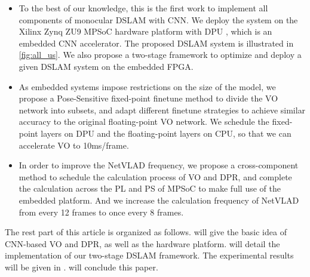 \begin{itemize}
\item To the best of our knowledge, this is the first work to implement all components of monocular DSLAM with CNN. We deploy the system on the Xilinx Zynq ZU9 MPSoC hardware platform with DPU \cite{Tech:2019360}, which is an embedded CNN accelerator. The proposed DSLAM system is illustrated in \cref{fig:all_us}. We also propose a two-stage framework to optimize and deploy a given DSLAM system on the embedded FPGA.
\item As embedded systems impose restrictions on the size of the model, we propose a Pose-Sensitive fixed-point finetune method to divide the VO network into subsets, and adapt different finetune strategies to achieve similar accuracy to the original floating-point VO network. We schedule the fixed-point layers on DPU and the floating-point layers on CPU, so that we can accelerate VO to 10ms/frame.
\item In order to improve the NetVLAD frequency, we propose a cross-component method to schedule the calculation process of VO and DPR, and complete the calculation across the PL and PS of MPSoC to make full use of the embedded platform. And we increase the calculation frequency of NetVLAD from every 12 frames to once every 8 frames.
\end{itemize}

The rest part of this article is organized as follows.  will give the basic idea of CNN-based VO and DPR, as well as the hardware platform.  will detail the implementation of our two-stage DSLAM framework. The experimental results will be given in .  will conclude this paper.

